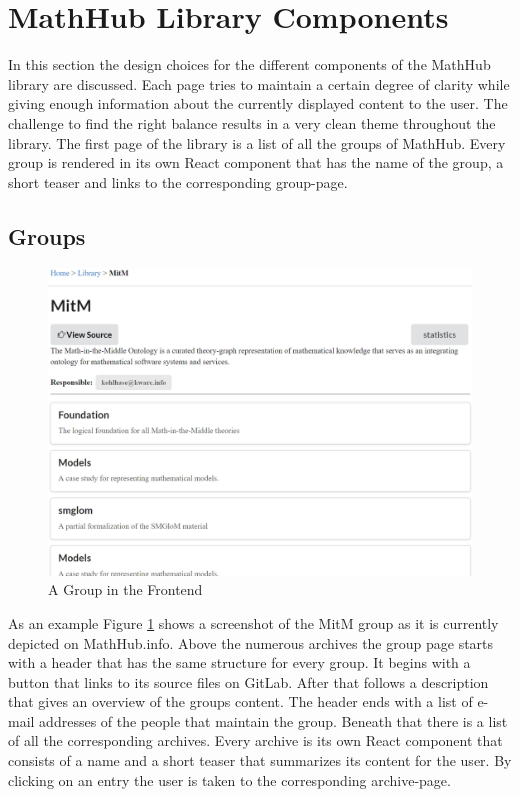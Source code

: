 \documentclass[11pt,a4paper]{article}
\begin{document}
\section{MathHub Library Components} \label{library}
In this section the design choices for the different components of the MathHub library are discussed.
Each page tries to maintain a certain degree of clarity while giving enough information about the currently displayed content to the user.
The challenge to find the right balance results in a very clean theme throughout the library.
The first page of the library is a list of all the groups of MathHub.
Every group is rendered in its own React component that has the name of the group, a short teaser and links to the corresponding group-page.

\subsection{Groups}
\begin{figure}[H]
\includegraphics[width=1\textwidth]{group.png}
\caption{A Group in the Frontend}
\label{fig:group}
\end{figure}
As an example Figure \ref{fig:group} shows a screenshot of the MitM group as it is currently depicted on MathHub.info.
Above the numerous archives the group page starts with a header that has the same structure for every group.
It begins with a button that links to its source files on GitLab.
After that follows a description that gives an overview of the groups content.
The header ends with a list of e-mail addresses of the people that maintain the group.
\newline \newline
Beneath that there is a list of all the corresponding archives.
Every archive is its own React component that consists of a name and a short teaser that summarizes its content for the user.
By clicking on an entry the user is taken to the corresponding archive-page.
\end{document}
